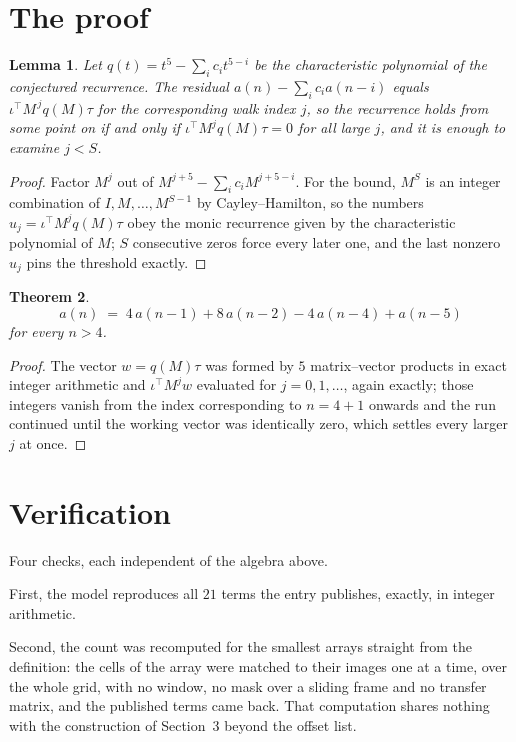 \documentclass[11pt,a4paper]{article}
\theoremstyle{plain}
\newtheorem{theorem}{Theorem}
\newtheorem{lemma}[theorem]{Lemma}
\theoremstyle{definition}
\begin{document}
\section{The proof}

\begin{lemma}\label{lem:crit}
Let $q(t)=t^{5}-\sum_i c_it^{5-i}$ be the characteristic polynomial of the
conjectured recurrence. The residual $a(n)-\sum_ic_ia(n-i)$ equals
$\iota^{\!\top}M^{\,j}q(M)\tau$ for the corresponding walk index $j$, so the recurrence
holds from some point on if and only if $\iota^{\!\top}M^{j}q(M)\tau=0$ for all large $j$,
and it is enough to examine $j<S$.
\end{lemma}

\begin{proof}
Factor $M^{j}$ out of $M^{j+5}-\sum_ic_iM^{j+5-i}$. For the bound, $M^{S}$
is an integer combination of $I,M,\dots,M^{S-1}$ by Cayley--Hamilton, so the numbers
$u_j=\iota^{\!\top}M^{j}q(M)\tau$ obey the monic recurrence given by the characteristic
polynomial of $M$; $S$ consecutive zeros force every later one, and the last nonzero $u_j$
pins the threshold exactly.
\end{proof}

\begin{theorem}
\[
a(n)\;=\;4\,a(n-1) + 8\,a(n-2) - 4\,a(n-4) + a(n-5)
\]
for every $n>4$.
\end{theorem}

\begin{proof}
The vector $w=q(M)\tau$ was formed by $5$ matrix--vector products in exact integer
arithmetic and $\iota^{\!\top}M^{j}w$ evaluated for $j=0,1,\dots$, again exactly; those
integers vanish from the index corresponding to $n=4+1$ onwards and the run continued
until the working vector was identically zero, which settles every larger $j$ at once.
\end{proof}

\section{Verification}

Four checks, each independent of the algebra above.

First, the model reproduces all $21$ terms the entry publishes, exactly, in integer
arithmetic.

Second, the count was recomputed for the smallest arrays straight from the definition: the
cells of the array were matched to their images one at a time, over the whole grid, with no
window, no mask over a sliding frame and no transfer matrix, and the published terms came back.
That computation shares nothing with the construction of Section~3 beyond the offset list.
\end{document}

